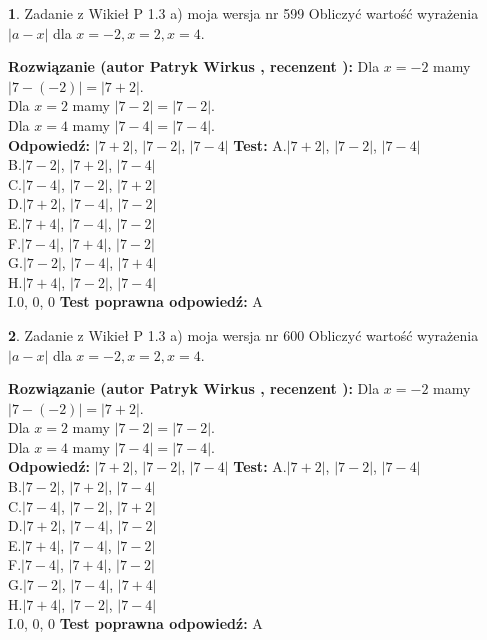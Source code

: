 \documentclass[12pt, a4paper]{article}
\theoremstyle{definition} %
\newtheorem{zad}{}
\newcommand{\zadStart}[1]{\begin{zad}#1\newline}
\newcommand{\zadStop}{\end{zad}}
\newcommand{\rozwStart}[2]{\noindent \textbf{Rozwiązanie (autor #1 , recenzent #2): }\newline}
\newcommand{\rozwStop}{\newline}
\newcommand{\odpStart}{\noindent \textbf{Odpowiedź:}\newline}
\newcommand{\odpStop}{\newline}
\newcommand{\testStart}{\noindent \textbf{Test:}\newline}
\newcommand{\testStop}{\newline}
\newcommand{\kluczStart}{\noindent \textbf{Test poprawna odpowiedź:}\newline}
\newcommand{\kluczStop}{\newline}
\begin{document}
\zadStart{Zadanie z Wikieł P 1.3 a) moja wersja nr 599}
Obliczyć wartość wyrażenia $|a - x|$ dla $x=-2,x=2,x=4$.
\zadStop
\rozwStart{Patryk Wirkus}{}
Dla $x = -2$ mamy $|7 - (-2)| = |7 + 2|$.\\
Dla $x = 2$ mamy $|7 - 2| = |7 - 2|$.\\
Dla $x = 4$ mamy $|7 - 4| = |7 - 4|$.\\
\rozwStop
\odpStart
$|7 + 2|$, $|7 - 2|$, $|7 - 4|$
\odpStop
\testStart
A.$|7 + 2|$, $|7 - 2|$, $|7 - 4|$\\
B.$|7 - 2|$, $|7 + 2|$, $|7 - 4|$\\
C.$|7 - 4|$, $|7 - 2|$, $|7 + 2|$\\
D.$|7 + 2|$, $|7 - 4|$, $|7 - 2|$\\
E.$|7 + 4|$, $|7 - 4|$, $|7 - 2|$\\
F.$|7 - 4|$, $|7 + 4|$, $|7 - 2|$\\
G.$|7 - 2|$, $|7 - 4|$, $|7 + 4|$\\
H.$|7 + 4|$, $|7 - 2|$, $|7 - 4|$\\
I.$0$, $0$, $0$
\testStop
\kluczStart
A
\kluczStop



\zadStart{Zadanie z Wikieł P 1.3 a) moja wersja nr 600}
Obliczyć wartość wyrażenia $|a - x|$ dla $x=-2,x=2,x=4$.
\zadStop
\rozwStart{Patryk Wirkus}{}
Dla $x = -2$ mamy $|7 - (-2)| = |7 + 2|$.\\
Dla $x = 2$ mamy $|7 - 2| = |7 - 2|$.\\
Dla $x = 4$ mamy $|7 - 4| = |7 - 4|$.\\
\rozwStop
\odpStart
$|7 + 2|$, $|7 - 2|$, $|7 - 4|$
\odpStop
\testStart
A.$|7 + 2|$, $|7 - 2|$, $|7 - 4|$\\
B.$|7 - 2|$, $|7 + 2|$, $|7 - 4|$\\
C.$|7 - 4|$, $|7 - 2|$, $|7 + 2|$\\
D.$|7 + 2|$, $|7 - 4|$, $|7 - 2|$\\
E.$|7 + 4|$, $|7 - 4|$, $|7 - 2|$\\
F.$|7 - 4|$, $|7 + 4|$, $|7 - 2|$\\
G.$|7 - 2|$, $|7 - 4|$, $|7 + 4|$\\
H.$|7 + 4|$, $|7 - 2|$, $|7 - 4|$\\
I.$0$, $0$, $0$
\testStop
\kluczStart
A
\kluczStop
\end{document}
